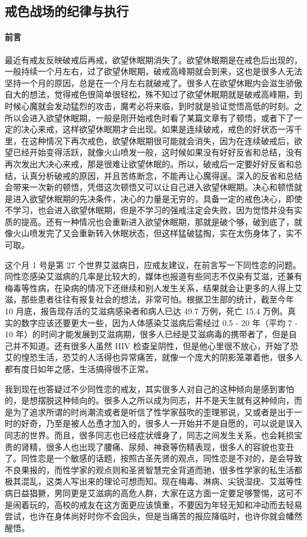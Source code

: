 \subsection{戒色战场的纪律与执行}

\paragraph*{前言}

最近有戒友反映破戒后再戒，欲望休眠期消失了。欲望休眠期是在戒色后出现的，一般持续一个月左右，过了欲望休眠期，破戒高峰期就会到来，这也是很多人无法坚持一个月的原因，总是在一个月左右就破戒了。很多人在欲望休眠内会滋生骄傲自大的想法，觉得戒色很简单很轻松，殊不知过了欲望休眠期就是破戒高峰期，到时候心魔就会发动猛烈的攻击，魔考必将来临，到时就是验证觉悟高低的时刻。之所以会进入欲望休眠期，一般是刚开始戒色时看了某篇文章有了顿悟，或者下了一定的决心来戒，这样欲望休眠期才会出现。如果是连续破戒，戒色的好状态一泻千里，在这种情况下再次戒色，欲望休眠期很可能就会消失，因为在连续破戒后，欲望已经开始变得活跃，就像火山喷发一般，这时候如果没有好好反省和总结，没有再次发出大决心来戒，那是很难让欲望休眠的。所以，破戒后一定要好好反省和总结，认真分析破戒的原因，并且苦练断念，不能再让心魔得逞。深入的反省和总结会带来一次新的顿悟，凭借这次顿悟又可以让自己进入欲望休眠期。决心和顿悟就是进入欲望休眠期的先决条件，决心的力量是无穷的，具备一定的戒色决心，即使不学习，也会进入欲望休眠期，但是不学习的强戒注定会失败，因为觉悟并没有实质的提高。还有一种情况也会重新进入欲望休眠期，那就是破个够，破到底了，就像火山喷发完了又会重新转入休眠状态，但这样猛破猛掏，实在太伤身体了，实不可取。

这个月 1 号是第 27 个世界艾滋病日，应戒友建议，在前言写一下同性恋的问题。同性恋感染艾滋病的几率是比较大的，媒体也报道有些同志不仅染有艾滋，还兼有梅毒等性病，在染病的情况下还继续和别人发生关系，结果就会让更多的人得上艾滋，那些患者往往有报复社会的想法，非常可怕。根据卫生部的统计，截至今年 10 月底，报告现存活的艾滋病感染者和病人已达 49.7 万例，死亡 15.4 万例。真实的数字应该还要更大一些，因为人体感染艾滋病后需经过 0.5 - 20 年（平均 7 - 10 年）的时间才能发展到艾滋病期，很多人已经是艾滋病毒的携带者了，但是自己并不知道。还有很多人虽然 HIV 检查呈阴性，但是他心里很不放心，开始了恐艾的惶恐生活，恐艾的人活得也异常痛苦，就像一个庞大的阴影笼罩着他，很多人都有度日如年之感，生活搞得很不正常。

我到现在也答疑过不少同性恋的戒友，其实很多人对自己的这种倾向是感到害怕的，是想摆脱这种倾向的。很多人之所以成为同志，并不是天生就有这种倾向，而是为了追求所谓的时尚潮流或者是听信了性学家鼓吹的歪理邪说，又或者是出于一时的好奇，乃至是被人怂恿才加入的，很多人一开始并不是自愿的，可以说是误入同志的世界。而且，很多同志也已经症状缠身了，同志之间发生关系，也会耗损宝贵的肾精，很多人也出现了腰痛、尿频、神衰等伤精表现，很多人的容貌也变丑了。同性恋是一个敏感的话题，按照古圣先贤的观点，同性恋是不对的，是会导致不良果报的，而性学家的观点则和圣贤智慧完全背道而驰，很多性学家的私生活都极其混乱，这类人写出来的理论可想而知。现在梅毒、淋病、尖锐湿疣、艾滋等性病日益猖獗，男同更是艾滋病的高危人群，大家在这方面一定要足够警惕，这可不是闹着玩的，高校的戒友在这方面更应该慎重，不要因为年轻无知和冲动而去轻易尝试，也许在身体尚好时你不会回头，但是当痛苦的报应降临时，也许你就会幡然醒悟。

